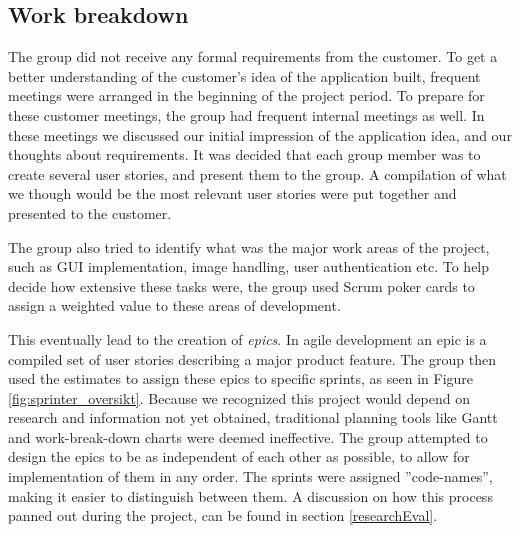 \subsection{Work breakdown}
\label{workbreakdown}

The group did not receive any formal requirements from the customer. To get a better understanding of the customer's idea of the application built, frequent meetings were arranged in the beginning of the project period. To prepare for these customer meetings, the group had frequent internal meetings as well. In these meetings we discussed our initial impression of the application idea, and our thoughts about requirements. It was decided that each group member was to create several user stories, and present them to the group. A compilation of what we though would be the most relevant user stories were put together and presented to the customer.

The group also tried to identify what was the major work areas of the project, such as GUI implementation, image handling, user authentication etc. To help decide how extensive these tasks were, the group used Scrum poker cards to assign a weighted value to these areas of development.

This eventually lead to the creation of \emph{epics}. In agile development an epic is a compiled set of user stories describing a major product feature. The group then used the estimates to assign these epics to specific sprints, as seen in Figure \ref{fig:sprinter_oversikt}. Because we recognized this project would depend on research and information not yet obtained, traditional planning tools like Gantt and work-break-down charts were deemed ineffective. The group attempted to design the epics to be as independent of each other as possible, to allow for implementation of them in any order. The sprints were assigned ''code-names'', making it easier to distinguish between them. A discussion on how this process panned out during the project, can be found in section \ref{researchEval}.


